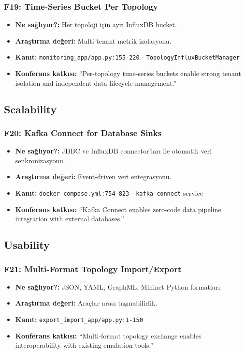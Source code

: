 \documentclass[10pt,a4paper]{article}
\begin{document}
\subsubsection{F19: Time-Series Bucket Per Topology}

\begin{itemize}
\item \textbf{Ne sağlıyor?:} Her topoloji için ayrı InfluxDB bucket.
\item \textbf{Araştırma değeri:} Multi-tenant metrik izolasyonu.
\item \textbf{Kanıt:} \texttt{monitoring\_app/app.py:155-220} - \texttt{TopologyInfluxBucketManager}
\item \textbf{Konferans katkısı:} ``Per-topology time-series buckets enable strong tenant isolation and independent data lifecycle management.''
\end{itemize}

\subsection{Scalability}

\subsubsection{F20: Kafka Connect for Database Sinks}

\begin{itemize}
\item \textbf{Ne sağlıyor?:} JDBC ve InfluxDB connector'ları ile otomatik veri senkronizasyonu.
\item \textbf{Araştırma değeri:} Event-driven veri entegrasyonu.
\item \textbf{Kanıt:} \texttt{docker-compose.yml:754-823} - \texttt{kafka-connect} service
\item \textbf{Konferans katkısı:} ``Kafka Connect enables zero-code data pipeline integration with external databases.''
\end{itemize}

\subsection{Usability}

\subsubsection{F21: Multi-Format Topology Import/Export}

\begin{itemize}
\item \textbf{Ne sağlıyor?:} JSON, YAML, GraphML, Mininet Python formatları.
\item \textbf{Araştırma değeri:} Araçlar arası taşınabilirlik.
\item \textbf{Kanıt:} \texttt{export\_import\_app/app.py:1-150}
\item \textbf{Konferans katkısı:} ``Multi-format topology exchange enables interoperability with existing emulation tools.''
\end{itemize}
\end{document}

